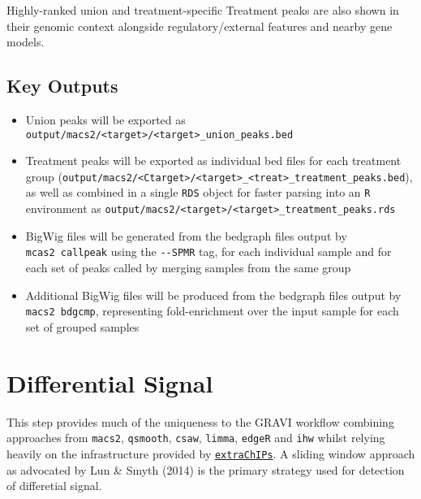 \documentclass[
]{book}
\providecommand{\tightlist}{%
  \setlength{\itemsep}{0pt}\setlength{\parskip}{0pt}}
\begin{document}
Highly-ranked union and treatment-specific Treatment peaks are also shown in their genomic context alongside regulatory/external features and nearby gene models.

\hypertarget{key-outputs}{%
\subsection*{Key Outputs}\label{key-outputs}}

\begin{itemize}
\tightlist
\item
  Union peaks will be exported as \texttt{output/macs2/\textless{}target\textgreater{}/\textless{}target\textgreater{}\_union\_peaks.bed}
\item
  Treatment peaks will be exported as individual bed files for each treatment group (\texttt{output/macs2/\textless{}Ctarget\textgreater{}/\textless{}target\textgreater{}\_\textless{}treat\textgreater{}\_treatment\_peaks.bed}), as well as combined in a single \texttt{RDS} object for faster parsing into an \texttt{R} environment as \texttt{output/macs2/\textless{}target\textgreater{}/\textless{}target\textgreater{}\_treatment\_peaks.rds}
\item
  BigWig files will be generated from the bedgraph files output by \texttt{mcas2\ callpeak} using the \texttt{-\/-SPMR} tag, for each individual sample and for each set of peaks called by merging samples from the same group
\item
  Additional BigWig files will be produced from the bedgraph files output by \texttt{macs2\ bdgcmp}, representing fold-enrichment over the input sample for each set of grouped samples
\end{itemize}

\hypertarget{differential-signal}{%
\section{Differential Signal}\label{differential-signal}}

This step provides much of the uniqueness to the GRAVI workflow combining approaches from \texttt{macs2}\citep{macs2}, \texttt{qsmooth}\citep{qsmooth}, \texttt{csaw}\citep{csaw}, \texttt{limma}\citep{limma}, \texttt{edgeR}\citep{edger} and \texttt{ihw}\citep{ihw} whilst relying heavily on the infrastructure provided by \href{https://bioconductor.org/packages/release/bioc/html/extraChIPs.html}{\texttt{extraChIPs}}.
A sliding window approach as advocated by Lun \& Smyth (2014) is the primary strategy used for detection of differetial signal.
\end{document}
